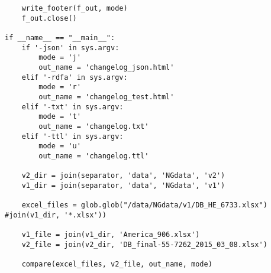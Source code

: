 \begin{verbatim}
	write_footer(f_out, mode)
	f_out.close()

if __name__ == "__main__":
	if '-json' in sys.argv:
		mode = 'j'
		out_name = 'changelog_json.html'
	elif '-rdfa' in sys.argv:
		mode = 'r'
		out_name = 'changelog_test.html'
	elif '-txt' in sys.argv:
		mode = 't'
		out_name = 'changelog.txt'
	elif '-ttl' in sys.argv:
		mode = 'u'
		out_name = 'changelog.ttl'

	v2_dir = join(separator, 'data', 'NGdata', 'v2')
	v1_dir = join(separator, 'data', 'NGdata', 'v1')
	
	excel_files = glob.glob("/data/NGdata/v1/DB_HE_6733.xlsx") #join(v1_dir, '*.xlsx'))
	
	v1_file = join(v1_dir, 'America_906.xlsx')
	v2_file = join(v2_dir, 'DB_final-55-7262_2015_03_08.xlsx')

	compare(excel_files, v2_file, out_name, mode)
\end{verbatim}


